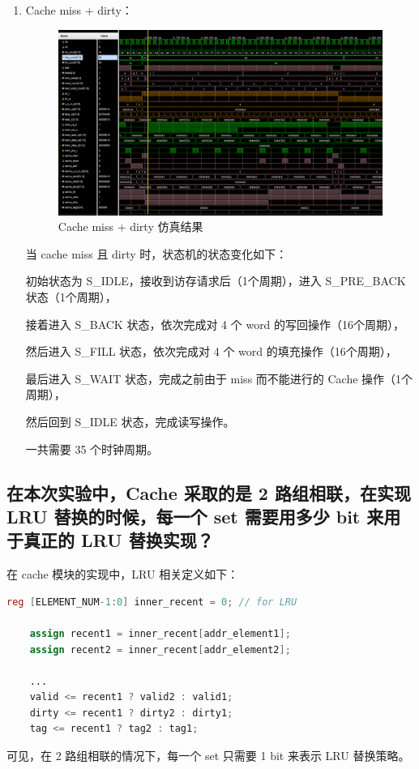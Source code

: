 \documentclass{article}
\begin{document}
\begin{enumerate}
    \newpage
    \item Cache miss + dirty：\par
    \begin{figure}[h]
        \centering
        \includegraphics[width=1\textwidth]{images/cache_miss_dirty.png}
        \caption{Cache miss + dirty 仿真结果}
        \label{fig:cache_miss_dirty}
    \end{figure}
    当 cache miss 且 dirty 时，状态机的状态变化如下：\par
    初始状态为 S\_IDLE，接收到访存请求后（1个周期），进入 S\_PRE\_BACK 状态（1个周期），\par
    接着进入 S\_BACK 状态，依次完成对 4 个 word 的写回操作（16个周期），\par
    然后进入 S\_FILL 状态，依次完成对 4 个 word 的填充操作（16个周期），\par
    最后进入 S\_WAIT 状态，完成之前由于 miss 而不能进行的 Cache 操作（1个周期），\par
    然后回到 S\_IDLE 状态，完成读写操作。\par
    一共需要 35 个时钟周期。\par

\end{enumerate}

\newpage
\subsection{在本次实验中，Cache 采取的是 2 路组相联，在实现 LRU 替换的时候，每一个 set 需要用多少 bit 来用于真正的 LRU 替换实现？}
在 cache 模块的实现中，LRU 相关定义如下：\par
\begin{lstlisting}[language=Verilog]
    reg [ELEMENT_NUM-1:0] inner_recent = 0; // for LRU

    assign recent1 = inner_recent[addr_element1];
    assign recent2 = inner_recent[addr_element2]; 

    ...
    valid <= recent1 ? valid2 : valid1;
    dirty <= recent1 ? dirty2 : dirty1;
    tag <= recent1 ? tag2 : tag1;
\end{lstlisting}
可见，在 2 路组相联的情况下，每一个 set 只需要 1 bit 来表示 LRU 替换策略。\par
\end{document}
